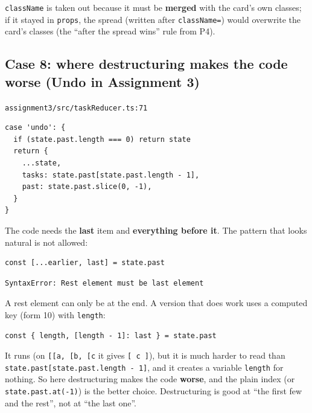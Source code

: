 \documentclass[
  10pt,
]{article}
\begin{document}
\texttt{className} is taken out because it must be \textbf{merged} with
the card's own classes; if it stayed in \texttt{props}, the spread
(written after \texttt{className=}) would overwrite the card's classes
(the ``after the spread wins'' rule from P4).

\hypertarget{case-8-where-destructuring-makes-the-code-worse-undo-in-assignment-3}{%
\subsection{Case 8: where destructuring makes the code worse (Undo in
Assignment
3)}\label{case-8-where-destructuring-makes-the-code-worse-undo-in-assignment-3}}

\texttt{assignment3/\allowbreak{}src/\allowbreak{}taskReducer.\allowbreak{}ts:71}

\begin{verbatim}
case 'undo': {
  if (state.past.length === 0) return state
  return {
    ...state,
    tasks: state.past[state.past.length - 1],
    past: state.past.slice(0, -1),
  }
}
\end{verbatim}

The code needs the \textbf{last} item and \textbf{everything before it}.
The pattern that looks natural is not allowed:

\begin{verbatim}
const [...earlier, last] = state.past
\end{verbatim}

\begin{verbatim}
SyntaxError: Rest element must be last element
\end{verbatim}

A rest element can only be at the end. A version that does work uses a
computed key (form 10) with \texttt{length}:

\begin{verbatim}
const { length, [length - 1]: last } = state.past
\end{verbatim}

It runs (on
\texttt{{[}{[}\allowbreak{}\textquotesingle{}a\allowbreak{}\textquotesingle{}{]\allowbreak{}},\ {[}\allowbreak{}\textquotesingle{}b\allowbreak{}\textquotesingle{}{]\allowbreak{}},\ {[}\allowbreak{}\textquotesingle{}c\allowbreak{}\textquotesingle{}{]\allowbreak{}}{]\allowbreak{}}}
it gives
\texttt{{[}\ \allowbreak{}\textquotesingle{}c\allowbreak{}\textquotesingle{}\ {]\allowbreak{}}}),
but it is much harder to read than
\texttt{state.\allowbreak{}past{[}state.\allowbreak{}past.\allowbreak{}length\ -\ 1{]\allowbreak{}}},
and it creates a variable \texttt{length} for nothing. So here
destructuring makes the code \textbf{worse}, and the plain index (or
\texttt{state.\allowbreak{}past.\allowbreak{}at(-1)}) is the better
choice. Destructuring is good at ``the first few and the rest'', not at
``the last one''.
\end{document}
